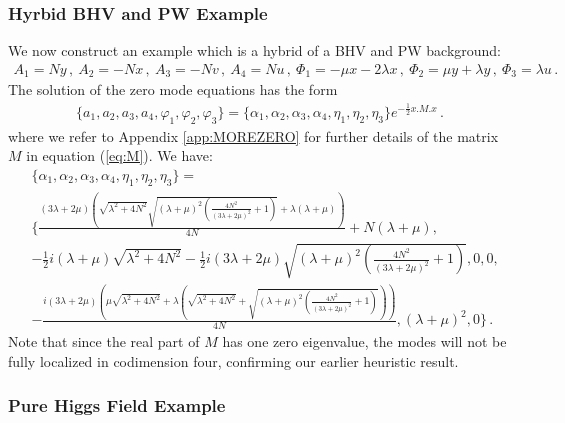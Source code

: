 \documentclass[12pt]{article}%
\numberwithin{equation}{section}
\newcommand{\al}[1]{\begin{align}#1\end{align}}
\renewcommand{\(}{\left(}
\renewcommand{\)}{\right)}
\renewcommand{\[}{\left[}
\renewcommand{\]}{\right]}
\begin{document}
\subsubsection{Hyrbid BHV and PW Example}

We now construct an example which is a hybrid of a BHV and PW background:
\al{ A_1 = N y\,, \ A_2 = - N x\,, \ A_3 = - N v\,, \ A_4 = N u\,, \ \Phi_1 = -  \mu x-2\lambda x\,, \ \Phi_2 = \mu y+\lambda y \,, \ \Phi_3 =  \lambda u\,.
}
The solution of the zero mode equations has the form
\al{ \{ a_1,a_2,a_3,a_4,\varphi_1,\varphi_2,\varphi_3\} = \{\alpha_1,\alpha_2,\alpha_3,\alpha_4,\eta_1,\eta_2,\eta_3\} e^{-\frac{1}{2} x.M.x}\,.
}
where we refer to Appendix \ref{app:MOREZERO} for further details of the matrix $M$ in equation (\ref{eq:M}). We have:
%
\al{&\{\alpha_1,\alpha_2,\alpha_3,\alpha_4,\eta_1,\eta_2,\eta_3\} =\\& \{
\frac{(3 \lambda +2 \mu ) \left(\sqrt{\lambda ^2+4 N ^2} \sqrt{(\lambda +\mu )^2
   \left(\frac{4 N ^2}{(3 \lambda +2 \mu )^2}+1\right)}+\lambda  (\lambda +\mu
   )\right)}{4 N }+N  (\lambda +\mu ) ,\\& -\frac{1}{2} i (\lambda +\mu ) \sqrt{\lambda ^2+4 N ^2}-\frac{1}{2} i (3 \lambda +2 \mu ) \sqrt{(\lambda +\mu )^2 \left(\frac{4 N ^2}{(3
   \lambda +2 \mu )^2}+1\right)} ,0 , 0 ,\\& -\frac{i (3 \lambda +2 \mu ) \left(\mu
   \sqrt{\lambda ^2+4 N ^2}+\lambda  \left(\sqrt{\lambda ^2+4 N ^2}+\sqrt{(\lambda
   +\mu )^2 \left(\frac{4 N ^2}{(3 \lambda +2 \mu )^2}+1\right)}\right)\right)}{4
   N } , (\lambda +\mu )^2 , 0  \}\,.
}
%
Note that since the real part of $M$ has one zero eigenvalue,
the modes will not be fully localized in codimension four,
confirming our earlier heuristic result.

\subsubsection{Pure Higgs Field Example}
\end{document}
